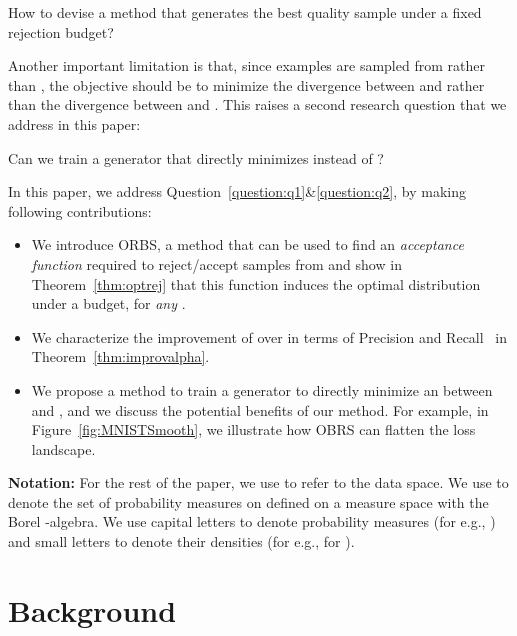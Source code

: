 \documentclass[twoside]{article}
\begin{document}
\begin{question}\label{question:q1}
    How to devise a method that generates the best quality sample under a fixed rejection budget?  
\end{question}

Another important limitation is that, since examples are sampled from  rather than , the objective should be to minimize the divergence between  and  rather than the divergence between  and . This raises a  second research question that we address in this paper:



\begin{question}\label{question:q2}
    Can we train a generator  that directly minimizes  instead of  ?
\end{question}

In this paper, we address Question~\ref{question:q1}\&\ref{question:q2}, by making following contributions:
\begin{itemize}
    \item    
    We introduce ORBS, a method that can be used to find an  {\em acceptance function} required to reject/accept samples from  and show in Theorem~\ref{thm:optrej} that this function induces the optimal distribution  under a budget, for \emph{any} \fdiv. 
    \item We characterize the improvement of  over  in terms of Precision and Recall~\citep{sajjadi_assessing_2018} in Theorem~\ref{thm:improvalpha}.
    \item We propose a method to train a generator  to directly minimize an \fdiv between  and , and we discuss the potential benefits of our method. For example, in Figure~\ref{fig:MNISTSmooth}, we illustrate how OBRS can flatten the loss landscape.    
\end{itemize}

\textbf{Notation: } For the rest of the paper, we use  to refer to the data space. We use  to denote the set of probability measures on  defined on a measure space with the Borel -algebra. We use capital letters to denote probability measures (for e.g., ) and small letters to denote their densities (for e.g.,  for ).

\section{Background}
\subsection{\fdivs}
\end{document}
